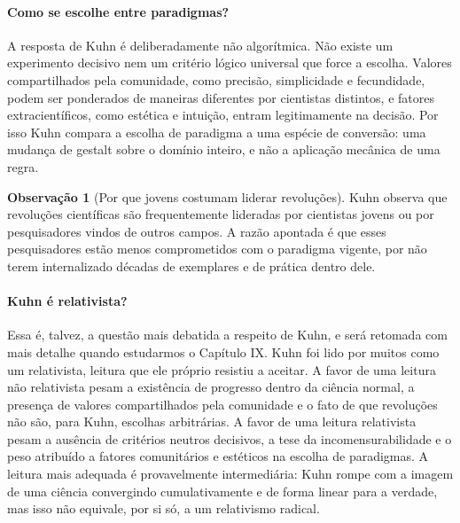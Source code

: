\documentclass[9pt,a4paper]{extarticle}
\newcommand{\impt}[1]{\textcolor{important}{#1}}
\theoremstyle{definition}
\newtheorem{remark}{Observação}[section]
\begin{document}
\paragraph{Como se escolhe entre paradigmas?}
A resposta de Kuhn é deliberadamente não algorítmica. Não existe um experimento decisivo nem um critério lógico universal que force a escolha. Valores compartilhados pela comunidade, como precisão, simplicidade e fecundidade, podem ser ponderados de maneiras diferentes por cientistas distintos, e fatores extracientíficos, como estética e intuição, entram legitimamente na decisão. Por isso Kuhn compara a escolha de paradigma a uma espécie de \impt{conversão}: uma mudança de gestalt sobre o domínio inteiro, e não a aplicação mecânica de uma regra.

\begin{remark}[Por que jovens costumam liderar revoluções]
Kuhn observa que revoluções científicas são frequentemente lideradas por cientistas jovens ou por pesquisadores vindos de outros campos. A razão apontada é que esses pesquisadores estão menos comprometidos com o paradigma vigente, por não terem internalizado décadas de exemplares e de prática dentro dele.
\end{remark}

\paragraph{Kuhn é relativista?}
Essa é, talvez, a questão mais debatida a respeito de Kuhn, e será retomada com mais detalhe quando estudarmos o Capítulo IX. Kuhn foi lido por muitos como um relativista, leitura que ele próprio resistiu a aceitar. A favor de uma leitura não relativista pesam a existência de progresso dentro da ciência normal, a presença de valores compartilhados pela comunidade e o fato de que revoluções não são, para Kuhn, escolhas arbitrárias. A favor de uma leitura relativista pesam a ausência de critérios neutros decisivos, a tese da incomensurabilidade e o peso atribuído a fatores comunitários e estéticos na escolha de paradigmas. A leitura mais adequada é provavelmente intermediária: Kuhn rompe com a imagem de uma ciência convergindo cumulativamente e de forma linear para a verdade, mas isso não equivale, por si só, a um relativismo radical.
\end{document}
